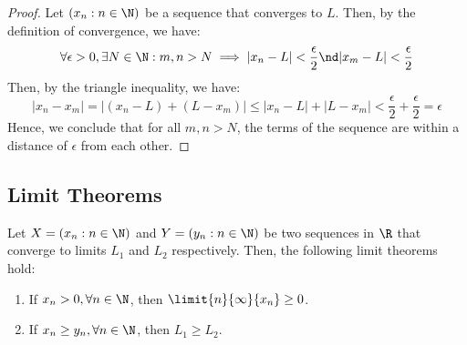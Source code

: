 \documentclass[openany]{book}
\begin{document}
\begin{proof}
    Let $(x_n : n \in \N)$ be a sequence that converges to $L$. Then, by the definition of convergence, we have:
    $$\forall \epsilon > 0, \exists N \in \N: m , n > N \implies |x_n - L| < \frac{\epsilon}{2} \nd |x_m - L| < \frac{\epsilon}{2}$$
    Then, by the triangle inequality, we have:
    $$|x_n - x_m| = |(x_n - L) + (L - x_m)| \leq |x_n - L| + |L - x_m| < \frac{\epsilon}{2} + \frac{\epsilon}{2} = \epsilon$$
    Hence, we conclude that for all $m, n > N$, the terms of the sequence are within a distance of $\epsilon$ from each other.
\end{proof}
\subsection{Limit Theorems}
\begin{mytheorem}
    Let $X = (x_n : n \in \N)$ and $Y = (y_n : n \in \N)$ be two sequences in $\R$ that converge to limits $L_1$ and $L_2$ respectively. Then, the following limit theorems hold:
    \begin{enumerate}
        \item If $x_n > 0, \forall n \in \N$, then $\limit{n}{\infty}{x_n} \geq 0$.
        \item If $x_n \geq y_n, \forall n \in \N$, then $L_1 \geq L_2$.
    \end{enumerate}
\end{mytheorem}
\end{document}
